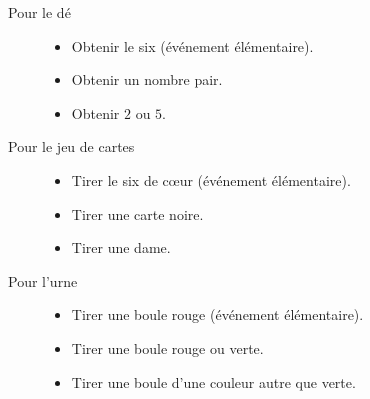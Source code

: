 \begin{example}
    \begin{description}
        \item[Pour le dé]
            \begin{itemize}
                \item Obtenir le six (événement élémentaire).
                \item
                    Obtenir un nombre pair.
                \item
                    Obtenir \( 2\) ou \( 5\).
            \end{itemize}
        \item[Pour le jeu de cartes]
    \begin{itemize}
        \item
            Tirer le six de cœur (événement élémentaire).
        \item Tirer une carte noire.
        \item
            Tirer une dame.
    \end{itemize}
\item[Pour l'urne]
    \begin{itemize}
        \item Tirer une boule rouge (événement élémentaire).
        \item
            Tirer une boule rouge ou verte.
        \item
            Tirer une boule d'une couleur autre que verte.
    \end{itemize}
    \end{description}
\end{example}
